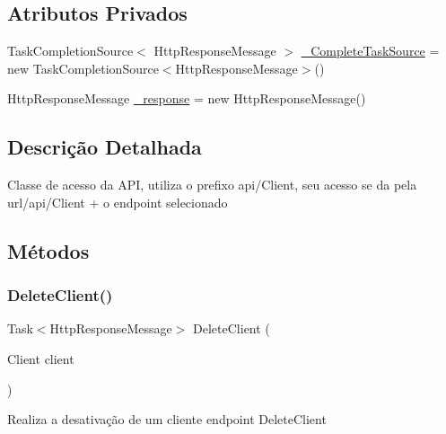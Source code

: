 \subsection*{Atributos Privados}
\begin{DoxyCompactItemize}
\item 
Task\+Completion\+Source$<$ Http\+Response\+Message $>$ \hyperlink{classApi3Layers_1_1Controllers_1_1ClientController_a467fbe1f298526ce8f849c2cd8f8fa4e}{\+\_\+\+Complete\+Task\+Source} = new Task\+Completion\+Source$<$Http\+Response\+Message$>$()
\item 
Http\+Response\+Message \hyperlink{classApi3Layers_1_1Controllers_1_1ClientController_addf535da0da455d00a0bd7a519f618cb}{\+\_\+response} = new Http\+Response\+Message()
\end{DoxyCompactItemize}


\subsection{Descrição Detalhada}
Classe de acesso da A\+PI, utiliza o prefixo api/\+Client, seu acesso se da pela url/api/\+Client + o endpoint selecionado 



\subsection{Métodos}
\mbox{\label{classApi3Layers_1_1Controllers_1_1ClientController_a9313f9369acc70d20109a5e2621486fd}} 
\subsubsection{\texorpdfstring{Delete\+Client()}{DeleteClient()}}
{\footnotesize\ttfamily Task$<$Http\+Response\+Message$>$ Delete\+Client (\begin{DoxyParamCaption}\item[{Client}]{client }\end{DoxyParamCaption})}



Realiza a desativação de um cliente endpoint Delete\+Client 


